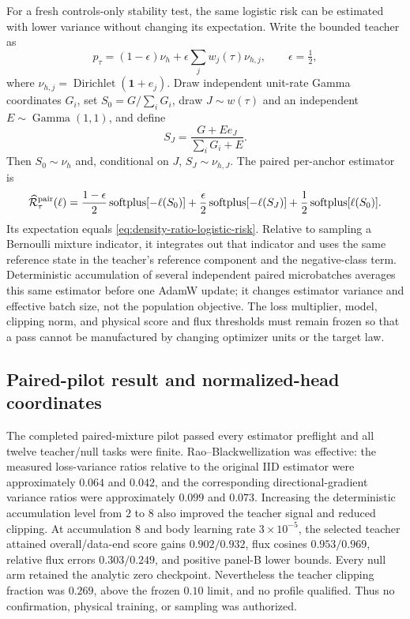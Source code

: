 \documentclass[11pt]{article}
\numberwithin{equation}{section}
\newcommand{\1}{\mathbf 1}
\begin{document}
For a fresh controls-only stability test, the same logistic risk can be
estimated with lower variance without changing its expectation.  Write the
bounded teacher as
\[
  p_\tau=(1-\epsilon)\nu_h+\epsilon\sum_j w_j(\tau)\nu_{h,j},
  \qquad \epsilon=\tfrac12,
\]
where \(\nu_{h,j}=\operatorname{Dirichlet}(\mathbf 1+e_j)\).  Draw independent
unit-rate Gamma coordinates \(G_i\), set
\(S_0=G/\sum_iG_i\), draw \(J\sim w(\tau)\) and an independent
\(E\sim\operatorname{Gamma}(1,1)\), and define
\[
  S_J=\frac{G+Ee_J}{\sum_iG_i+E}.
\]
Then \(S_0\sim\nu_h\) and, conditional on \(J\),
\(S_J\sim\nu_{h,J}\).  The paired per-anchor estimator is
\begin{equation}\label{eq:density-ratio-paired-risk}
  \widehat{\mathcal R}^{\rm pair}_\tau(\ell)
  =\frac{1-\epsilon}{2}\operatorname{softplus}[-\ell(S_0)]
   +\frac{\epsilon}{2}\operatorname{softplus}[-\ell(S_J)]
   +\frac12\operatorname{softplus}[\ell(S_0)].
\end{equation}
Its expectation equals \eqref{eq:density-ratio-logistic-risk}.  Relative to
sampling a Bernoulli mixture indicator, it integrates out that indicator and
uses the same reference state in the teacher's reference component and the
negative-class term.  Deterministic accumulation of several independent
paired microbatches averages this same estimator before one AdamW update; it
changes estimator variance and effective batch size, not the population
objective.  The loss multiplier, model, clipping norm, and physical score and
flux thresholds must remain frozen so that a pass cannot be manufactured by
changing optimizer units or the target law.

\subsection{Paired-pilot result and normalized-head coordinates}

The completed paired-mixture pilot passed every estimator preflight and all
twelve teacher/null tasks were finite.  Rao--Blackwellization was effective:
the measured loss-variance ratios relative to the original IID estimator were
approximately \(0.064\) and \(0.042\), and the corresponding directional-gradient
variance ratios were approximately \(0.099\) and \(0.073\).  Increasing the
deterministic accumulation level from \(2\) to \(8\) also improved the teacher
signal and reduced clipping.  At accumulation \(8\) and body learning rate
\(3\mathbin{\times}10^{-5}\), the selected teacher attained overall/data-end
score gains \(0.902/0.932\), flux cosines \(0.953/0.969\), relative flux errors
\(0.303/0.249\), and positive panel-B lower bounds.  Every null arm retained
the analytic zero checkpoint.  Nevertheless the teacher clipping fraction
was \(0.269\), above the frozen \(0.10\) limit, and no profile qualified.  Thus
no confirmation, physical training, or sampling was authorized.
\end{document}
